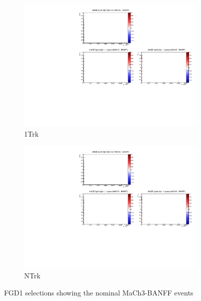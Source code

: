 \begin{figure}[h]
\begin{subfigure}[t]{0.24\textwidth}
		\includegraphics[width=\textwidth, trim={5mm 70mm 100mm 7mm}, clip, page=6]{figures/mach3/banff/momentumProjections_170328_withMACH3_MAQEonly}
		\caption{\numu 1Trk}
	\end{subfigure}
	\begin{subfigure}[t]{0.24\textwidth}
		\includegraphics[width=\textwidth, trim={5mm 70mm 100mm 7mm}, clip, page=7]{figures/mach3/banff/momentumProjections_170328_withMACH3_MAQEonly}
		\caption{\numu NTrk}
	\end{subfigure}
	\caption{FGD1 selections showing the nominal MaCh3-BANFF events}
	\label{fig:mach3_banff_prefit_fgd1}
\end{figure}

